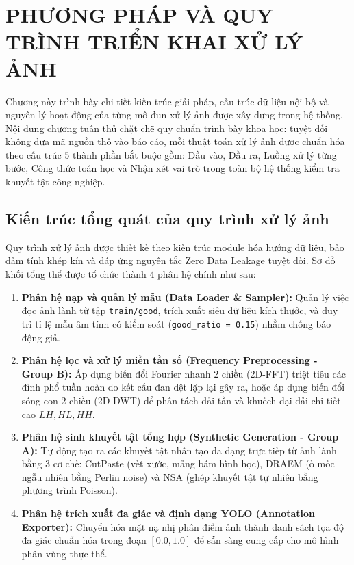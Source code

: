 \chapter{PHƯƠNG PHÁP VÀ QUY TRÌNH TRIỂN KHAI XỬ LÝ ẢNH}

Chương này trình bày chi tiết kiến trúc giải pháp, cấu trúc dữ liệu nội bộ và nguyên lý hoạt động của từng mô-đun xử lý ảnh được xây dựng trong hệ thống. Nội dung chương tuân thủ chặt chẽ quy chuẩn trình bày khoa học: tuyệt đối không đưa mã nguồn thô vào báo cáo, mỗi thuật toán xử lý ảnh được chuẩn hóa theo cấu trúc 5 thành phần bắt buộc gồm: Đầu vào, Đầu ra, Luồng xử lý từng bước, Công thức toán học và Nhận xét vai trò trong toàn bộ hệ thống kiểm tra khuyết tật công nghiệp.

\section{Kiến trúc tổng quát của quy trình xử lý ảnh}

Quy trình xử lý ảnh được thiết kế theo kiến trúc module hóa hướng dữ liệu, bảo đảm tính khép kín và đáp ứng nguyên tắc Zero Data Leakage tuyệt đối. Sơ đồ khối tổng thể được tổ chức thành 4 phân hệ chính như sau:
\begin{enumerate}
    \item \textbf{Phân hệ nạp và quản lý mẫu (Data Loader \& Sampler):} Quản lý việc đọc ảnh lành từ tập \texttt{train/good}, trích xuất siêu dữ liệu kích thước, và duy trì tỉ lệ mẫu âm tính có kiểm soát (\texttt{good\_ratio = 0.15}) nhằm chống báo động giả.
    \item \textbf{Phân hệ lọc và xử lý miền tần số (Frequency Preprocessing - Group B):} Áp dụng biến đổi Fourier nhanh 2 chiều (2D-FFT) triệt tiêu các đỉnh phổ tuần hoàn do kết cấu đan dệt lặp lại gây ra, hoặc áp dụng biến đổi sóng con 2 chiều (2D-DWT) để phân tách dải tần và khuếch đại dải chi tiết cao $LH, HL, HH$.
    \item \textbf{Phân hệ sinh khuyết tật tổng hợp (Synthetic Generation - Group A):} Tự động tạo ra các khuyết tật nhân tạo đa dạng trực tiếp từ ảnh lành bằng 3 cơ chế: CutPaste (vết xước, mảng bám hình học), DRAEM (ố mốc ngẫu nhiên bằng Perlin noise) và NSA (ghép khuyết tật tự nhiên bằng phương trình Poisson).
    \item \textbf{Phân hệ trích xuất đa giác và định dạng YOLO (Annotation Exporter):} Chuyển hóa mặt nạ nhị phân điểm ảnh thành danh sách tọa độ đa giác chuẩn hóa trong đoạn $[0.0, 1.0]$ để sẵn sàng cung cấp cho mô hình phân vùng thực thể.
\end{enumerate}

